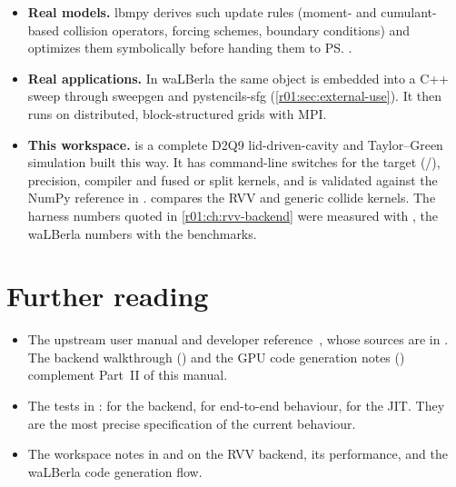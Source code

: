 \begin{itemize}
  \item \textbf{Real models.} lbmpy derives such update rules (moment- and
        cumulant-based collision operators, forcing schemes, boundary conditions) and
        optimizes them symbolically before handing them to \ps.
  \item \textbf{Real applications.} In waLBerla the same  object is
        embedded into a C++ sweep through sweepgen and pystencils-sfg
        (\cref{r01:sec:external-use}). It then runs on distributed, block-structured grids
        with MPI.
  \item \textbf{This workspace.}  is a
        complete D2Q9 lid-driven-cavity and Taylor--Green simulation built this way.
        It has command-line switches for the target (/),
        precision, compiler and fused or split kernels, and is validated against the
        NumPy reference in .
         compares the RVV and generic collide kernels.
        The harness numbers quoted in \cref{r01:ch:rvv-backend} were measured with
        , the waLBerla numbers with the
         benchmarks.
\end{itemize}

\section{Further reading}
\begin{itemize}
  \item The upstream user manual and developer reference~\cite{pystencils-docs}, whose
        sources are in . The backend walkthrough
        () and the GPU code generation notes
        () complement Part~II of this manual.
  \item The tests in :  for the
        backend,  for end-to-end behaviour,  for the
        JIT. They are the most precise specification of the current behaviour.
  \item The workspace notes in  and  on the RVV
        backend, its performance, and the waLBerla code generation flow.
\end{itemize}
